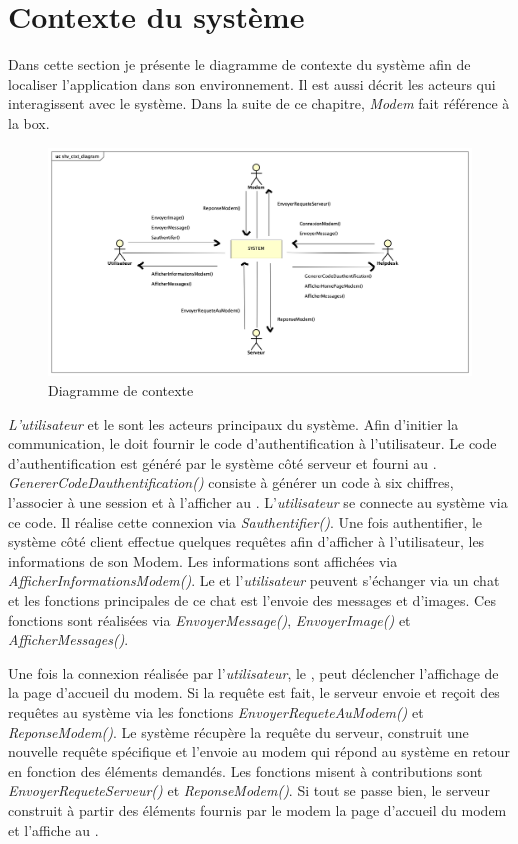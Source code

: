 \section{Contexte du système}
Dans cette section je présente le diagramme de contexte du système afin de localiser l'application dans son environnement. Il est aussi décrit les acteurs qui interagissent avec le système. Dans la suite de ce chapitre, \textit{Modem} fait référence à la box.
\begin{figure}[H]
	\centering
	\includegraphics[scale=0.4]{assets/images/shv_ctxt.png}
	\caption{Diagramme de contexte}
	\label{fig.4}
\end{figure} 

\emph{L'utilisateur} et le \hd sont les acteurs principaux du système. Afin d'initier la communication, le \hd doit fournir le code d'authentification à l'utilisateur. Le code d'authentification est généré par le système côté serveur et fourni au \hd. \textit{GenererCodeDauthentification()} consiste à générer un code à six chiffres, l'associer à une session et à l'afficher au \hd. L'\emph{utilisateur} se connecte au système via ce code. Il réalise cette connexion via \textit{Sauthentifier()}. Une fois authentifier, le système côté client effectue quelques requêtes afin d'afficher à l'utilisateur, les informations de son Modem. Les informations sont affichées via \textit{AfficherInformationsModem()}. Le \hd et l'\emph{utilisateur} peuvent s'échanger via un chat et les fonctions principales de ce chat est l'envoie des messages et d'images. Ces fonctions sont réalisées via \textit{EnvoyerMessage()}, \textit{EnvoyerImage()} et \textit{AfficherMessages()}.

 Une fois la connexion réalisée par l'\emph{utilisateur}, le \hd, peut déclencher l'affichage de la page d'accueil du modem. Si la requête est fait, le serveur envoie et reçoit des requêtes au système via les fonctions \textit{EnvoyerRequeteAuModem()} et \textit{ReponseModem()}. Le système récupère la requête du serveur, construit une nouvelle requête spécifique et l'envoie au modem qui répond au système en retour en fonction des éléments demandés. Les fonctions misent à contributions sont \textit{EnvoyerRequeteServeur()} et \textit{ReponseModem()}. Si tout se passe bien, le serveur construit à partir des éléments fournis par le modem la page d'accueil du modem et l'affiche au \hd.
 
